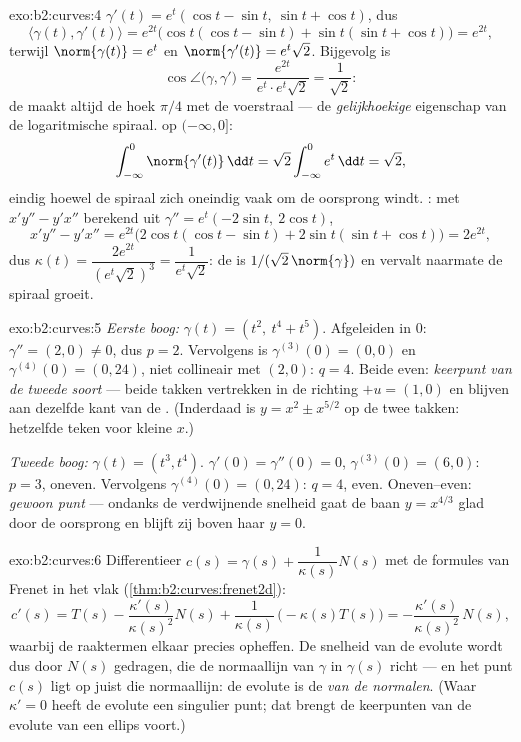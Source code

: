 \begin{solution}{exo:b2:curves:4}
$\gamma'(t) = e^t(\cos t - \sin t,\ \sin t + \cos t)$, dus
\[
\langle \gamma(t), \gamma'(t)\rangle = e^{2t}
\bigl(\cos t(\cos t - \sin t) + \sin t(\sin t + \cos t)\bigr)
= e^{2t},
\]
terwijl $\norm{\gamma(t)} = e^t$ en $\norm{\gamma'(t)} =
e^t\sqrt 2$. Bijgevolg is
\[
\cos\angle\bigl(\gamma, \gamma'\bigr)
= \frac{e^{2t}}{e^t \cdot e^t\sqrt2} = \frac{1}{\sqrt2} :
\]
de  maakt altijd de hoek $\pi/4$ met de voerstraal --- de
\emph{gelijkhoekige} eigenschap van de logaritmische spiraal.
 op $(-\infty, 0]$:
\[
\int_{-\infty}^0 \norm{\gamma'(t)}\,\dd t
= \sqrt2\int_{-\infty}^0 e^t\,\dd t = \sqrt 2 ,
\]
eindig hoewel de spiraal zich oneindig vaak om de oorsprong windt.
: met $x'y'' - y'x''$ berekend uit $\gamma'' = e^t(-2\sin
t,\ 2\cos t)$,
\[
x'y'' - y'x'' = e^{2t}\bigl(2\cos t(\cos t - \sin t)
+ 2\sin t(\sin t + \cos t)\bigr) = 2e^{2t},
\]
dus $\kappa(t) = \dfrac{2e^{2t}}{(e^t\sqrt2)^3} =
\dfrac{1}{e^t\sqrt2}$: de  is $1/(\sqrt2\, \norm{\gamma})$
en vervalt naarmate de spiraal groeit.
\end{solution}

\begin{solution}{exo:b2:curves:5}
\emph{Eerste boog:} $\gamma(t) = (t^2,\ t^4 + t^5)$. Afgeleiden in
$0$: $\gamma'' = (2, 0) \neq 0$, dus $p = 2$. Vervolgens is
$\gamma^{(3)}(0) = (0, 0)$ en $\gamma^{(4)}(0) = (0, 24)$, niet
collineair met $(2, 0)$: $q = 4$. Beide even: \emph{keerpunt van de
tweede soort} --- beide takken vertrekken in de richting $+u =
(1,0)$ en blijven aan dezelfde kant van de . (Inderdaad is
$y = x^2 \pm x^{5/2}$ op de twee takken: hetzelfde teken voor
kleine $x$.)

\emph{Tweede boog:} $\gamma(t) = (t^3, t^4)$. $\gamma'(0) =
\gamma''(0) = 0$, $\gamma^{(3)}(0) = (6, 0)$: $p = 3$, oneven.
Vervolgens $\gamma^{(4)}(0) = (0, 24)$: $q = 4$, even.
Oneven--even: \emph{gewoon punt} --- ondanks de verdwijnende
snelheid gaat de baan $y = x^{4/3}$ glad door de oorsprong en
blijft zij boven haar  $y = 0$.
\end{solution}

\begin{solution}{exo:b2:curves:6}
Differentieer $c(s) = \gamma(s) + \dfrac{1}{\kappa(s)}N(s)$ met de
formules van Frenet in het vlak
(\cref{thm:b2:curves:frenet2d}):
\[
c'(s) = T(s) - \frac{\kappa'(s)}{\kappa(s)^2}N(s)
+ \frac{1}{\kappa(s)}\,\bigl(-\kappa(s)T(s)\bigr)
= -\frac{\kappa'(s)}{\kappa(s)^2}\,N(s) ,
\]
waarbij de raaktermen elkaar precies opheffen. De snelheid van de
evolute wordt dus door $N(s)$ gedragen, die de normaallijn van
$\gamma$ in $\gamma(s)$ richt --- en het punt $c(s)$ ligt op juist
die normaallijn: de evolute is de \emph{ van de
normalen}. (Waar $\kappa' = 0$ heeft de evolute een singulier punt;
dat brengt de keerpunten van de evolute van een ellips voort.)
\end{solution}

